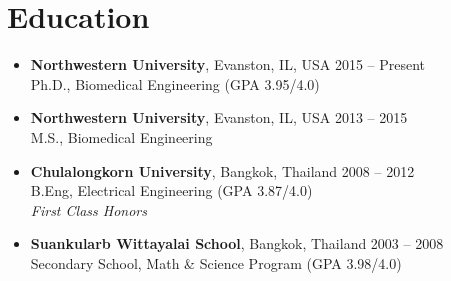 \section{\sc Education}

\begin{itemize}[leftmargin=0cm, label={}]

\item {\bf Northwestern University}, Evanston, IL, USA \hfill 2015 -- Present \\
Ph.D., Biomedical Engineering \hfill (GPA 3.95/4.0)

\item {\bf Northwestern University}, Evanston, IL, USA \hfill 2013 -- 2015 \\
M.S., Biomedical Engineering

\item {\bf Chulalongkorn University}, Bangkok, Thailand \hfill 2008 -- 2012 \\
B.Eng, Electrical Engineering \hfill (GPA 3.87/4.0)\\
{\em First Class Honors}

\item {\bf Suankularb Wittayalai School}, Bangkok, Thailand \hfill 2003 -- 2008 \\
Secondary School, Math \& Science Program \hfill(GPA 3.98/4.0)

\end{itemize}
